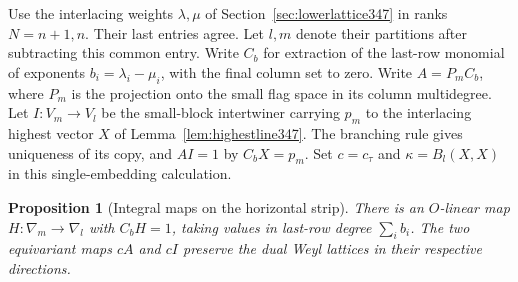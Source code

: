 \documentclass[a4paper,11pt]{article}
\newtheorem{proposition}{Proposition}[section]
\theoremstyle{definition}
\theoremstyle{remark}
\numberwithin{equation}{section}
\begin{document}
Use the interlacing weights \(\lambda,\mu\) of
Section~\ref{sec:lowerlattice347} in ranks \(N=n+1,n\). Their
last entries agree. Let \(l,m\) denote their partitions after
subtracting this common entry. Write \(C_b\) for extraction
of the last-row monomial of exponents \(b_i=\lambda_i-\mu_i\),
with the final column set to zero. Write \(A=P_m C_b\), where
\(P_m\) is the projection onto the small flag space in its
column multidegree. Let \(I:V_m\longrightarrow V_l\) be the
small-block intertwiner carrying \(p_m\) to the interlacing
highest vector \(X\) of Lemma~\ref{lem:highestline347}.
The branching rule gives uniqueness of its copy, and
\(A I=1\) by \(C_b X=p_m\). Set \(c=c_\tau\) and
\(\kappa=B_l(X,X)\) in this single-embedding calculation.

\begin{proposition}[Integral maps on the horizontal strip]\leavevmode
\label{prop:tableaulift351}
There is an \(O\)-linear map \(H:\nabla_m\longrightarrow\nabla_l\)
with \(C_bH=1\), taking values in last-row degree \(\sum_i b_i\).
The two equivariant maps \(c A\) and \(c I\) preserve the dual
Weyl lattices in their respective directions.
\end{proposition}
\end{document}
